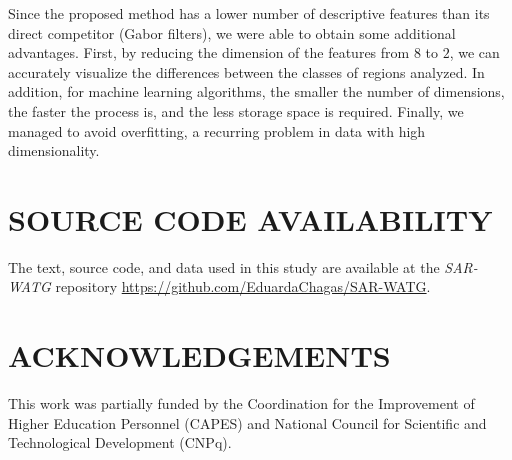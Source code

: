 \documentclass[journal]{IEEEtran}
\begin{document}
Since the proposed method has a lower number of descriptive features than its direct competitor (Gabor filters), we were able to obtain some additional advantages.
First, by reducing the dimension of the features from $8$ to $2$, we can accurately visualize the differences between the classes of regions analyzed.
In addition, for machine learning algorithms, the smaller the number of dimensions, the faster the process is, and the less storage space is required.
Finally, we managed to avoid overfitting, a recurring problem in data with high dimensionality.


\section{SOURCE CODE AVAILABILITY} 

The text, source code, and data used in this study are available at the \textit{SAR-WATG} repository \url{https://github.com/EduardaChagas/SAR-WATG}.


%


\section*{ACKNOWLEDGEMENTS}\label{ACKNOWLEDGEMENTS}

This work was partially funded by the Coordination for the Improvement of Higher Education Personnel (CAPES) and National Council for Scientific and Technological Development (CNPq).
\end{document}
